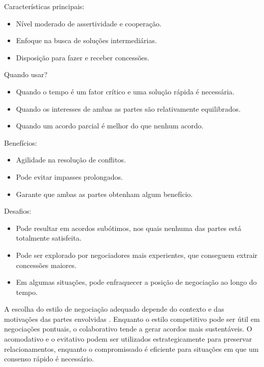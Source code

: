 \documentclass[article,12pt,oneside,a4paper]{article}
\begin{document}
Características principais:

\begin{itemize}
\item Nível moderado de assertividade e cooperação.
\item Enfoque na busca de soluções intermediárias.
\item Disposição para fazer e receber concessões.
\end{itemize}

Quando usar?

\begin{itemize}
\item Quando o tempo é um fator crítico e uma solução rápida é necessária.
\item Quando os interesses de ambas as partes são relativamente equilibrados.
\item Quando um acordo parcial é melhor do que nenhum acordo.
\end{itemize}

Benefícios:

\begin{itemize}
\item Agilidade na resolução de conflitos.
\item Pode evitar impasses prolongados.
\item Garante que ambas as partes obtenham algum benefício.
\end{itemize}

Desafios:

\begin{itemize}
\item Pode resultar em acordos subótimos, nos quais nenhuma das partes está totalmente satisfeita.
\item Pode ser explorado por negociadores mais experientes, que conseguem extrair concessões maiores.
\item Em algumas situações, pode enfraquecer a posição de negociação ao longo do tempo.
\end{itemize}

A escolha do estilo de negociação adequado depende do contexto e das motivações das partes envolvidas \cite{malhotra2016negotiation}. Enquanto o estilo competitivo pode ser útil em negociações pontuais, o colaborativo tende a gerar acordos mais sustentáveis. O acomodativo e o evitativo podem ser utilizados estrategicamente para preservar relacionamentos, enquanto o compromissado é eficiente para situações em que um consenso rápido é necessário.
\end{document}
